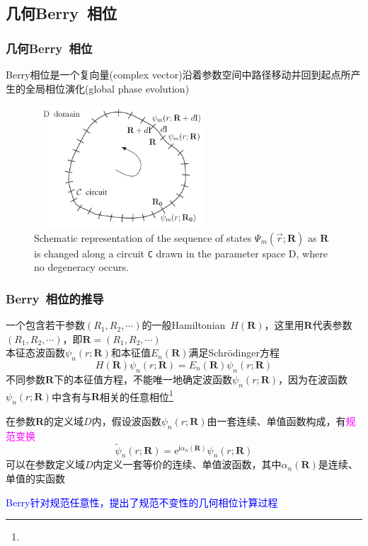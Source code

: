 \subsection{几何\rm{Berry~}相位}
\frame
{
	\frametitle{几何\textrm{Berry~}相位}
	\textrm{Berry}相位是一个复向量\textrm{(complex vector)}沿着参数空间中路径移动并回到起点所产生的全局相位演化\textrm{(global phase evolution)}
\begin{figure}[h!]
\centering
\vspace*{-0.12in}
\includegraphics[height=1.8in,width=2.6in,viewport=0 0 800 540,clip]{Figures/Berry_Phase.png}
\caption{\tiny \textrm{Schematic representation of the sequence of states $\Psi_m(\vec r;\mathbf{R})$ as $\mathbf{R}$ is changed along a circuit \texttt{C} drawn in the parameter space D, where no degeneracy occurs.}}%
\label{Berry_Phase}
\end{figure} 
}

\frame
{
	\frametitle{\textrm{Berry~}相位的推导}
	一个包含若干参数$(R_1,R_2,\cdots)$的一般\textrm{Hamiltonian}~$H(\mathbf{R})$，这里用$\mathbf{R}$代表参数$(R_1,R_2,\cdots)$，即$\mathbf{R}=(R_1,R_2,\cdots)$\\
	本征态波函数$\psi_n(r;\mathbf{R})$和本征值$E_n(\mathbf{R})$满足\textrm{Schr\"odinger}方程
	\begin{displaymath}
		H(\mathbf{R})\psi_n(r;\mathbf{R})=E_n(\mathbf{R})\psi_n(r;\mathbf{R})
	\end{displaymath}
	不同参数$\mathbf{R}$下的本征值方程，不能唯一地确定波函数$\psi_n(r;\mathbf{R})$，因为在波函数$\psi_n(r;\mathbf{R})$中含有与$\mathbf{R}$相关的任意相位\footnote{\fontsize{6.0pt}{3.2pt}}

	在参数$\mathbf{R}$的定义域$D$内，假设波函数$\psi_n(r;\mathbf{R})$由一套连续、单值函数构成，有\textcolor{magenta}{规范变换}
	\begin{displaymath}
		\tilde{\psi}_n(r;\mathbf{R})=\mathrm{e}^{\mathrm{i}\alpha_n(\mathbf{R})}\psi_n(r;\mathbf{R})
	\end{displaymath}
	可以在参数定义域$D$内定义一套等价的连续、单值波函数，其中$\alpha_n(\mathbf{R})$是连续、单值的实函数

	\textcolor{blue}{\textrm{Berry}针对规范任意性，提出了规范不变性的几何相位计算过程}
}

